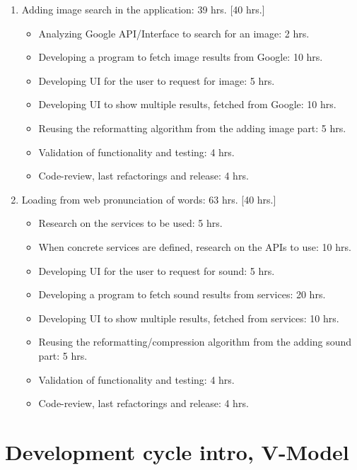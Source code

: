 \documentclass[a4paper,11pt,twoside]{article}
\begin{document}
\begin{enumerate}
\item Adding image search in the application: 39 hrs. [40 hrs.]
  \begin{itemize}
   \item Analyzing Google API/Interface to search for an image: 2 hrs.
   \item Developing a program to fetch image results from Google: 10 hrs.
   \item Developing UI for the user to request for image: 5 hrs.
   \item Developing UI to show multiple results, fetched from Google: 10 hrs.
   \item Reusing the reformatting algorithm from the adding image part: 5 hrs.
   \item Validation of functionality and testing: 4 hrs.
   \item Code-review, last refactorings and release: 4 hrs.
  \end{itemize}

\item Loading from web pronunciation of words: 63 hrs. [40 hrs.]
  \begin{itemize}
   \item Research on the services to be used: 5 hrs.
   \item When concrete services are defined, research on the APIs to use: 10 hrs.
   \item Developing UI for the user to request for sound: 5 hrs.
   \item Developing a program to fetch sound results from services: 20 hrs.
   \item Developing UI to show multiple results, fetched from services: 10 hrs.
   \item Reusing the reformatting/compression algorithm from the adding sound part: 5 hrs.
   \item Validation of functionality and testing: 4 hrs.
   \item Code-review, last refactorings and release: 4 hrs.
  \end{itemize}

   

\end{enumerate}







\section{Development cycle intro, V-Model}
\end{document}
